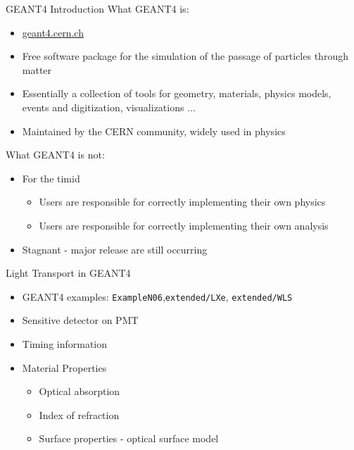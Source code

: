 \begin{frame}[fragile]{GEANT4 Introduction}
What GEANT4 is:
\begin{itemize}
  \small
  \item \href{geant4.cern.ch}{geant4.cern.ch}
  \item Free software package for the simulation of the passage of particles through matter
  \item Essentially a collection of tools for geometry, materials, physics models, events and digitization, visualizations $\dots$
  \item Maintained by the CERN community, widely used in physics
\end{itemize}
What GEANT4 is not:
\begin{itemize}
  \small
  \item For the timid
  \begin{itemize}
    \item Users are responsible for correctly implementing their own physics
    \item Users are responsible for correctly implementing their own analysis
  \end{itemize}
  \item Stagnant - major release are still occurring
\end{itemize}
\hyperlink{G4Main}{}
\hyperlink{toc}{}
\end{frame}
\begin{frame}[fragile]{Light Transport in GEANT4}
\begin{itemize}
  \item GEANT4 examples: \verb+ExampleN06+,\verb+extended/LXe+, \verb+extended/WLS+
  \item Sensitive detector on PMT
  \item Timing information
  \item Material Properties
  \small
  \begin{itemize}
    \item Optical absorption
    \item Index of refraction
    \item Surface properties - optical surface model \cite{5485130}
  \end{itemize}
\end{itemize}
\hyperlink{G4Main}{}
\hyperlink{toc}{}
\end{frame}
